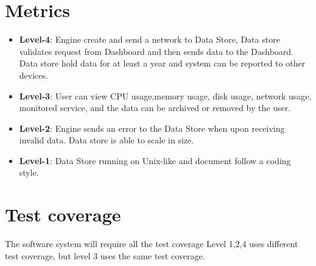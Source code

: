 \documentclass[letterpaper,12pt,oneside,listof=totoc]{scrreprt}
\begin{document}
\section{Metrics}
\begin{itemize}
\item \textbf{Level-4}: Engine create and send a network to Data Store, Data store validates request from Dashboard and then sends data to the Dashboard. Data store hold data for at least a year and system can be reported to other devices. 

\item \textbf{Level-3}: User can view CPU usage,memory usage, disk usage, network usage, monitored service, and the data can be archived or removed by the user.

\item \textbf{Level-2}: Engine sends an error to the Data Store when upon receiving invalid data. Data store is able to scale in size.

\item \textbf{Level-1}: Data Store running on Unix-like and document follow a coding style.

\end{itemize}
\section{Test coverage}

The software system will require all the test coverage Level 1,2,4 uses different test coverage, but level 3 uses the same test coverage.
\end{document}
